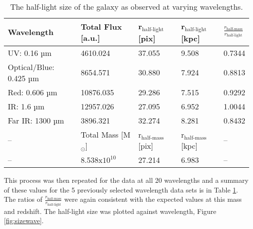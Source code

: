 \documentclass[10pt, preprint]{aastex}
\begin{document}
\begin{table}[H]
    \centering
    \begin{tabular}{lllll}
        \hline
         Wavelength             & Total Flux [a.u.]     & r$_{\textrm{half-light}}$ [pix]   &  r$_{\textrm{half-light}}$ [kpc]  & $\frac{r_{\textrm{half-mass}}}{r_{\textrm{half-light}}}$  \\\hline
         UV: 0.16 µm            & 4610.024              & 37.055                            & 9.508                             & 0.7344        \\
         Optical/Blue: 0.425 µm & 8654.571              & 30.880                            & 7.924                             & 0.8813        \\
         Red: 0.606 µm          & 10876.035             & 29.286                            & 7.515                             & 0.9292        \\
         IR: 1.6 µm             & 12957.026             & 27.095                            & 6.952                             & 1.0044        \\
         Far IR: 1300 µm        & 3896.321              & 32.274                            & 8.281                             & 0.8432        \\\hline
         --                     & Total Mass [M$_\odot$]& r$_{\textrm{half-mass}}$ [pix]    & r$_{\textrm{half-mass}}$ [kpc]    & --            \\\hline
         --                     & 8.538x$10^{10}$       & 27.214                            & 6.983                             & --            \\\hline
    \end{tabular}
    \caption{The half-light size of the galaxy as observed at varying wavelengths.}
    \label{tab:wavelengths}
\end{table}

\vspace{-0.5\baselineskip}

This process was then repeated for the data at all 20 wavelengths and a summary of these values for the 5 previously selected wavelength data sets is in Table \ref{tab:wavelengths}. The ratios of $\tfrac{r_{\textrm{half-mass}}}{r_{\textrm{half-light}}}$ were again consistent with the expected values at this mass and redshift. The half-light size was plotted against wavelength, Figure \ref{fig:sizewave}. 

\vspace{-1.4\baselineskip}
\end{document}
